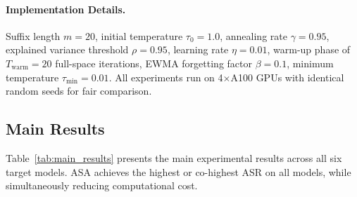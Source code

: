 ﻿\documentclass[lettersize,journal]{IEEEtran}
\begin{document}
\paragraph{Implementation Details.} Suffix length $m = 20$, initial temperature $\tau_0 = 1.0$, annealing rate $\gamma = 0.95$, explained variance threshold $\rho = 0.95$, learning rate $\eta = 0.01$, warm-up phase of $T_{\text{warm}} = 20$ full-space iterations, EWMA forgetting factor $\beta = 0.1$, minimum temperature $\tau_{\min} = 0.01$. All experiments run on 4$\times$A100 GPUs with identical random seeds for fair comparison.

\subsection{Main Results}
\label{sec:main_results}

Table~\ref{tab:main_results} presents the main experimental results across all six target models. ASA achieves the highest or co-highest ASR on all models, while simultaneously reducing computational cost.
\end{document}
